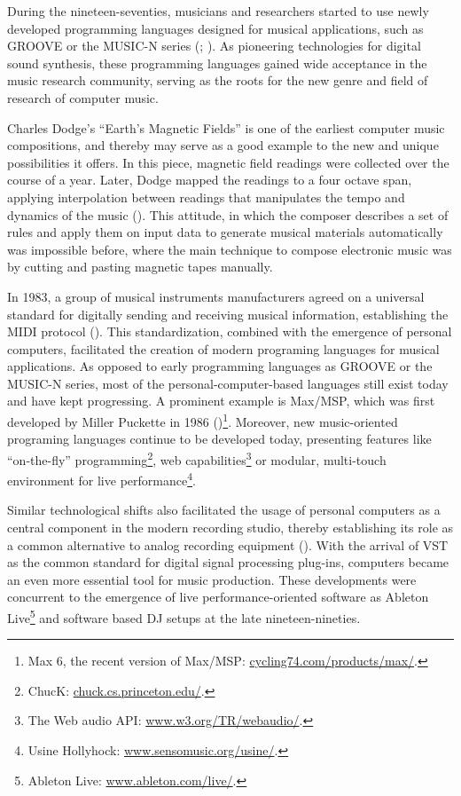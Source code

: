 \documentclass[a4paper,11pt]{article}
\begin{document}
During the nineteen-seventies, musicians and researchers started to use newly developed programming languages designed for musical applications, such as GROOVE or the MUSIC-N series (\cite{mathews70}; \cite{mathews69}).
As pioneering technologies for digital sound synthesis, these programming languages gained wide acceptance in the music research community, serving as the roots for the new genre and field of research of computer music.

Charles Dodge's ``Earth's Magnetic Fields'' is one of the earliest computer music compositions, and thereby may serve as a good example to the new and unique possibilities it offers.
In this piece, magnetic field readings were collected over the course of a year.
Later, Dodge mapped the readings to a four octave span, applying interpolation between readings that manipulates the tempo and dynamics of the music (\cite{scriptsgrooves14}).
This attitude, in which the composer describes a set of rules and apply them on input data to generate musical materials automatically was impossible before, where the main technique to compose electronic music was by cutting and pasting magnetic tapes manually.

In 1983, a group of musical instruments manufacturers agreed on a universal standard for digitally sending and receiving musical information, establishing the MIDI protocol (\cite{web:quinn}).
This standardization, combined with the emergence of personal computers, facilitated the creation of modern programing languages for musical applications.
As opposed to early programming languages as GROOVE or the MUSIC-N series, most of the personal-computer-based languages still exist today and have kept progressing.
A prominent example is Max/MSP, which was first developed by Miller Puckette in 1986 (\cite[p. 16]{winkler01})\footnote{Max 6, the recent version of Max/MSP: \href{http://cycling74.com/products/max/}{cycling74.com/products/max/}.}.
Moreover, new music-oriented programing languages continue to be developed today, presenting features like ``on-the-fly'' programming\footnote{ChucK: \href{http://chuck.cs.princeton.edu/}{chuck.cs.princeton.edu/}.}, web capabilities\footnote{The Web audio API: \href{http://www.w3.org/TR/webaudio/}{www.w3.org/TR/webaudio/}.} or modular, multi-touch environment for live performance\footnote{Usine Hollyhock: \href{http://www.sensomusic.org/usine/}{www.sensomusic.org/usine/}.}.

Similar technological shifts also facilitated the usage of personal computers as a central component in the modern recording studio, thereby establishing its role as a common alternative to analog recording equipment (\cite{leider:04}).
With the arrival of VST as the common standard for digital signal processing plug-ins, computers became an even more essential tool for music production.
These developments were concurrent to the emergence of live performance-oriented software as Ableton Live\footnote{Ableton Live: \href{http://www.ableton.com/en/live/}{www.ableton.com/live/}.} and software based DJ setups at the late nineteen-nineties.
\end{document}
